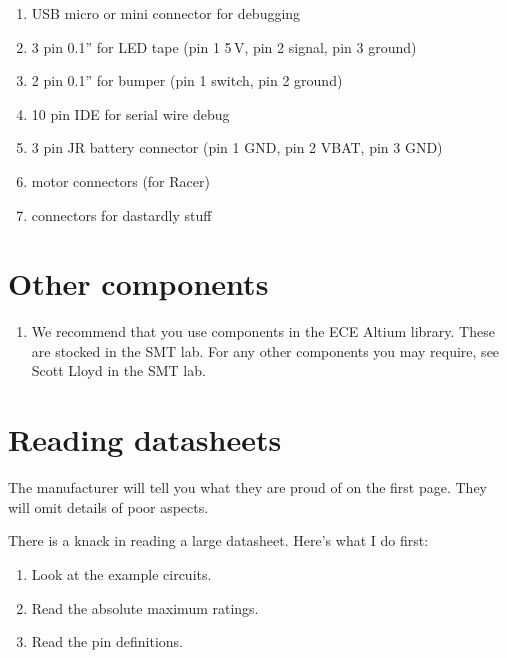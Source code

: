 \begin{enumerate}
\item USB micro or mini connector for debugging
\item 3 pin 0.1'' for LED tape (pin 1 5\,V, pin 2 signal, pin 3 ground)
\item 2 pin 0.1'' for bumper (pin 1 switch, pin 2 ground)
\item 10 pin IDE for serial wire debug
\item 3 pin JR battery connector (pin 1 GND, pin 2 VBAT, pin 3 GND)
\item motor connectors (for Racer)
\item connectors for dastardly stuff
\end{enumerate}


\section{Other components}

\begin{enumerate}
\item We recommend that you use components in the ECE Altium library.
  These are stocked in the SMT lab.  For any other components you may
  require, see Scott Lloyd in the SMT lab.
\end{enumerate}


\section{Reading datasheets}

The manufacturer will tell you what they are proud of on the first
page.  They will omit details of poor aspects.

There is a knack in reading a large datasheet.  Here's what I do
first:

\begin{enumerate}
\item Look at the example circuits.

\item Read the absolute maximum ratings.

\item Read the pin definitions.
\end{enumerate}



